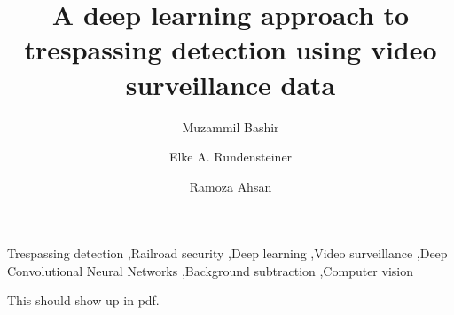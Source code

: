 \documentclass[preprint,3p,times,twocolumn]{elsarticle}
\begin{document}
\begin{frontmatter}
\title{A deep learning approach to trespassing detection using video surveillance data}


\author{Muzammil Bashir}
\author{Elke A. Rundensteiner}
\author{Ramoza Ahsan}

\address{Department of Computer Science, Worcester Polytechnic Institute, United States}





\begin{keyword}
Trespassing detection \sep Railroad security \sep Deep learning \sep Video surveillance \sep Deep Convolutional Neural Networks \sep Background subtraction \sep Computer vision
\end{keyword}

\end{frontmatter}

This should show up in pdf.









\end{document}
